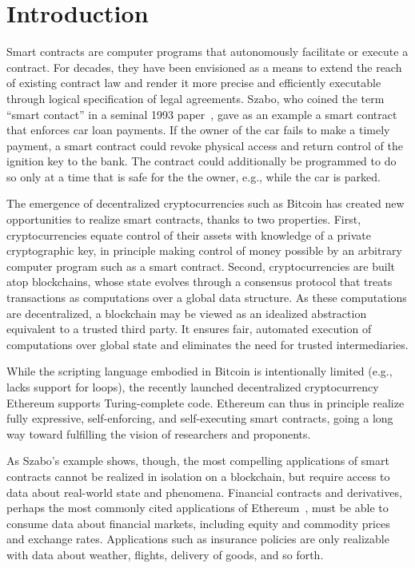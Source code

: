 
\section{Introduction}

Smart contracts are computer programs that autonomously facilitate or execute a contract. For decades, they have been envisioned as a means to extend the reach of existing contract law and render it more precise and efficiently executable through logical specification of legal agreements. Szabo, who coined the term ``smart contact'' in a seminal 1993 paper~\cite{}, gave as an example a smart contract that enforces car loan payments. If the owner of the car fails to make a timely payment, a smart contract could revoke physical access and return control of the ignition key to the bank. The contract could additionally be programmed to do so only at a time that is safe for the the owner, e.g., while the car is parked.

The emergence of decentralized cryptocurrencies such as Bitcoin has created new opportunities to realize smart contracts, thanks to two properties. First, cryptocurrencies equate control of their assets with knowledge of a private cryptographic key, in principle making control of money possible by an arbitrary computer program such as a smart contract. Second, cryptocurrencies are built atop blockchains, whose state evolves through a consensus protocol that treats transactions as computations over a global data structure. As these computations are decentralized, a blockchain may be viewed as an idealized abstraction equivalent to a trusted third party. It ensures fair, automated execution of computations over global state and eliminates the need for trusted intermediaries. 

While the scripting language embodied in Bitcoin is intentionally limited (e.g., lacks support for loops), the recently launched decentralized cryptocurrency Ethereum supports Turing-complete code. Ethereum can thus in principle realize fully expressive, self-enforcing, and self-executing smart contracts, going a long way toward fulfilling the vision of researchers and proponents.  

As Szabo's example shows, though, the most compelling applications of smart contracts cannot be realized in isolation on a blockchain, but require access to data about real-world state and phenomena. Financial contracts and derivatives, perhaps the most commonly cited applications of Ethereum~\cite{}, must be able to consume data about financial markets, including equity and commodity prices and exchange rates. Applications such as insurance policies are only realizable with data about weather, flights, delivery of goods, and so forth. 

